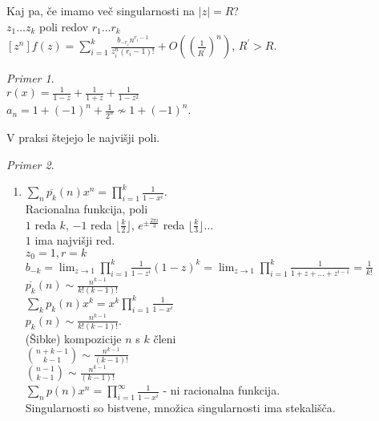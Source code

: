 \documentclass[a4paper, 12pt]{book}
\theoremstyle{definition}
\theoremstyle{remark}
\newtheorem*{ex}{Primer}
\begin{document}
Kaj pa, če imamo več singularnosti na $|z| = R$? \\
$z_1 \dots z_k$ poli redov $r_1 \dots r_k$ \\
$[z^n] f(z) = \sum_{i=1}^{k} \frac{b_{-r_i} n^{r_i-1}}{z_i^n (r_i-1)!} +
O\left(\left(\frac{1}{R^{'}}\right)^n\right)$, $R^{'} > R$.
\begin{ex} \text{} \\
  $r(x) = \frac{1}{1-z} + \frac{1}{1+z} + \frac{1}{1-z^2}$ \\
  $a_n = 1 + (-1)^n + \frac{1}{2^n} \nsim 1 + (-1)^n$.
\end{ex}
V praksi štejejo le najvišji poli.
\begin{ex} \text{} \\
  \begin{enumerate}[label=(\alph*)]
    \item $\sum_n \overline{p_k}(n) x^n = \prod_{i=1}^k \frac{1}{1-x^i}$. \\
      Racionalna funkcija, poli \\
      $1$ reda $k$, $-1$ reda $\lfloor\frac{k}{2}\rfloor$, $e^{\pm \frac{2 \pi i}{3}}$ reda
      $\lfloor\frac{k}{3}\rfloor \dots$ \\
      $1$ ima najvišji red. \\
      $z_0 = 1, r = k$ \\
      $b_{-k} = \lim_{z \to 1} \prod_{i=1}^k \frac{1}{1-z^i} (1-z)^k =
      \lim_{z \to 1} \prod_{i=1}^k \frac{1}{1 + z + \dots + z^{i-1}} = \frac{1}{k!}$ \\
      $\overline{p_k}(n) \sim \frac{n^{k-1}}{k! (k-1)!}$ \\
      $\sum_k p_k(n) x^k = x^k \prod_{i=1}^{k} \frac{1}{1-x^i}$ \\
      $p_k(n) \sim \frac{n^{k-1}}{k! (k-1)!}$. \\
      (Šibke) kompozicije $n$ s $k$ členi \\
      $\binom{n+k-1}{k-1} \sim \frac{n^{k-1}}{(k-1)!}$ \\
      $\binom{n-1}{k-1} \sim \frac{n^{k-1}}{(k-1)!}$ \\
      $\sum_n p(n) x^n = \prod_{i=1}^{\infty} \frac{1}{1-x^i}$ - ni racionalna funkcija. \\
      Singularnosti so bistvene, množica singularnosti ima stekališča.
  \end{enumerate}
\end{ex}


\end{document}
